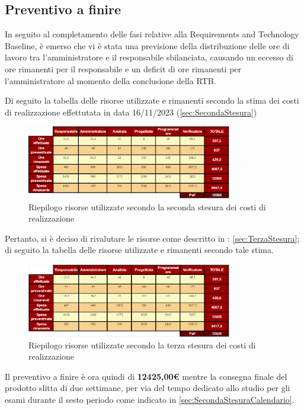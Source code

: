 \subsection{Preventivo a finire}
In seguito al completamento delle fasi relative alla Requirements and Technology Baseline, è emerso che vi è stata una previsione della distribuzione delle ore di lavoro tra l'amministratore e il responsabile sbilanciata, causando un eccesso di ore rimanenti per il responsabile e un deficit di ore rimanenti per l'amministratore al momento della conclusione della RTB.

Di seguito la tabella delle risorse utilizzate e rimanenti secondo la stima dei costi di realizzazione effettutata in data 16/11/2023 (\ref{sec:SecondaStesura})
\begin{figure}[H]
    \centering
    \includegraphics[width=0.8\textwidth]{../Images/PaF1stesura.PNG}
    \caption{Riepilogo risorse utilizzate secondo la seconda stesura dei costi di realizzazione}
    \label{fig:RisorseRimanentiRTB}
\end{figure}

Pertanto, si è deciso di rivalutare le risorse come descritto in : \ref{sec:TerzaStesura};
di seguito la tabella delle risorse utilizzate e rimanenti secondo tale stima.

\begin{figure}[H]
    \centering
    \includegraphics[width=0.8\textwidth]{../Images/PaF2stesura.PNG}
    \caption{Riepilogo risorse utilizzate secondo la terza stesura dei costi di realizzazione}
    \label{fig:RisorseRimanentiRTB2}
\end{figure}
Il preventivo a finire è ora quindi di \textbf{12425,00€} mentre la consegna finale del prodotto slitta di due
settimane, per via del tempo dedicato allo studio per gli esami durante il sesto periodo come indicato in \ref{sec:SecondaStesuraCalendario}.

